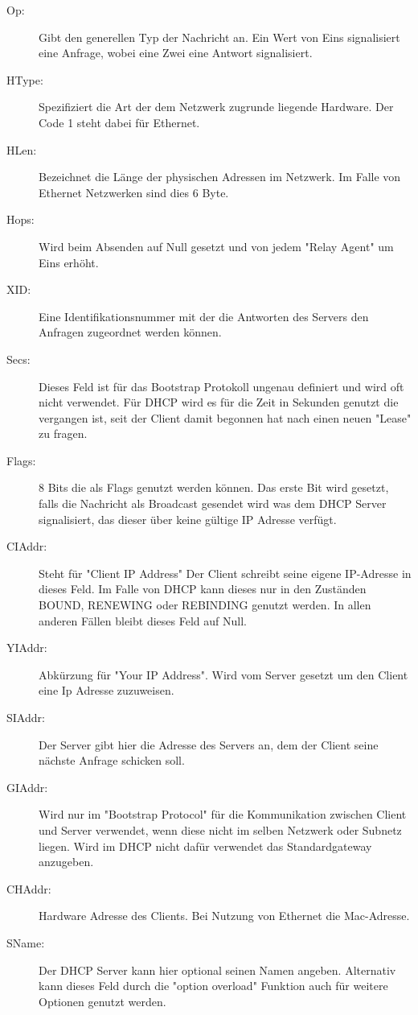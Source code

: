 \begin{description}

\item[Op: ] Gibt den generellen Typ der Nachricht an. Ein Wert von Eins signalisiert eine Anfrage, wobei eine Zwei eine Antwort signalisiert.
\item[HType: ] Spezifiziert die Art der dem Netzwerk zugrunde liegende Hardware. Der Code 1 steht dabei für Ethernet. 
\item[HLen: ] Bezeichnet die Länge der physischen Adressen im Netzwerk. Im Falle von Ethernet Netzwerken sind dies 6 Byte. 
\item[Hops: ] Wird beim Absenden auf Null gesetzt und von jedem {}"Relay Agent" um Eins erhöht. 
\item[XID: ] Eine Identifikationsnummer mit der die Antworten des Servers den Anfragen zugeordnet werden können.
\item[Secs: ] Dieses Feld ist für das Bootstrap Protokoll ungenau definiert und wird oft nicht verwendet. Für DHCP wird es für die Zeit in Sekunden genutzt die vergangen ist, seit der Client damit begonnen hat nach einen neuen {}"Lease{}" zu fragen. 
\item[Flags: ] 8 Bits die als Flags genutzt werden können. Das erste Bit wird gesetzt, falls die Nachricht als Broadcast gesendet wird was dem DHCP Server signalisiert, das dieser über keine gültige IP Adresse verfügt.
\item[CIAddr: ] Steht für {}"Client IP Address"{} Der Client schreibt seine eigene IP-Adresse in dieses Feld. Im Falle von DHCP kann dieses nur in den Zuständen BOUND, RENEWING oder REBINDING genutzt werden. In allen anderen Fällen bleibt dieses Feld auf Null.
\item[YIAddr: ] Abkürzung für "Your IP Address". Wird vom Server gesetzt um den Client eine Ip Adresse zuzuweisen. 
\item[SIAddr: ] Der Server gibt hier die Adresse des Servers an, dem der Client seine nächste Anfrage schicken soll. 
\item[GIAddr: ] Wird nur im {}"Bootstrap Protocol{}" für die Kommunikation zwischen Client und Server verwendet, wenn diese nicht im selben Netzwerk oder Subnetz liegen. Wird im DHCP nicht dafür verwendet das Standardgateway anzugeben. 
\item[CHAddr: ] Hardware Adresse des Clients. Bei Nutzung von Ethernet die Mac-Adresse. 
\item[SName: ] Der DHCP Server kann hier optional seinen Namen angeben. Alternativ kann dieses Feld durch die {}"option overload"{} Funktion auch für weitere Optionen genutzt werden.

\end{description}
